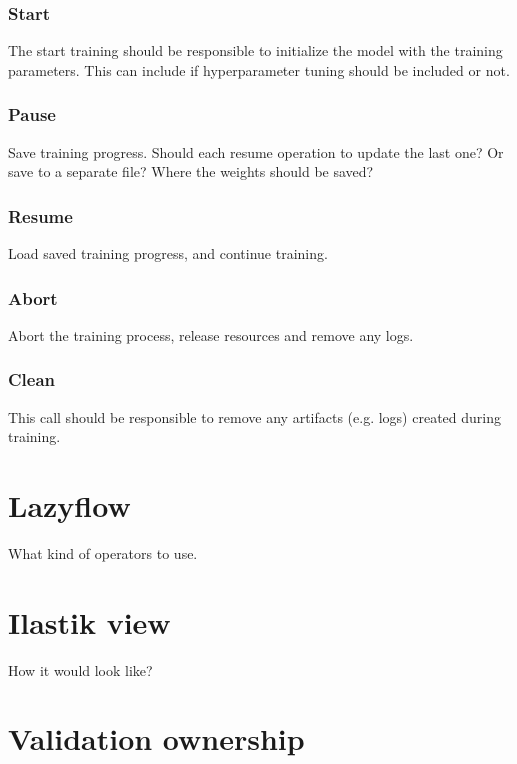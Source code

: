\documentclass[12pt, a4paper]{article}
\begin{document}
\subsubsection{Start}

The start training should be responsible to initialize the model with the training parameters. This can include if hyperparameter tuning should be included or not.

\subsubsection{Pause}

Save training progress. Should each resume operation to update the last one? Or save to a separate file? Where the weights should be saved?

\subsubsection{Resume}

Load saved training progress, and continue training. 

\subsubsection{Abort}

Abort the training process, release resources and remove any logs.

\subsubsection{Clean}

This call should be responsible to remove any artifacts (e.g. logs) created during training.

\section{Lazyflow}

What kind of operators to use.

\section{Ilastik view}

How it would look like?

\section{Validation ownership}
\label{sec:validation}
\end{document}
